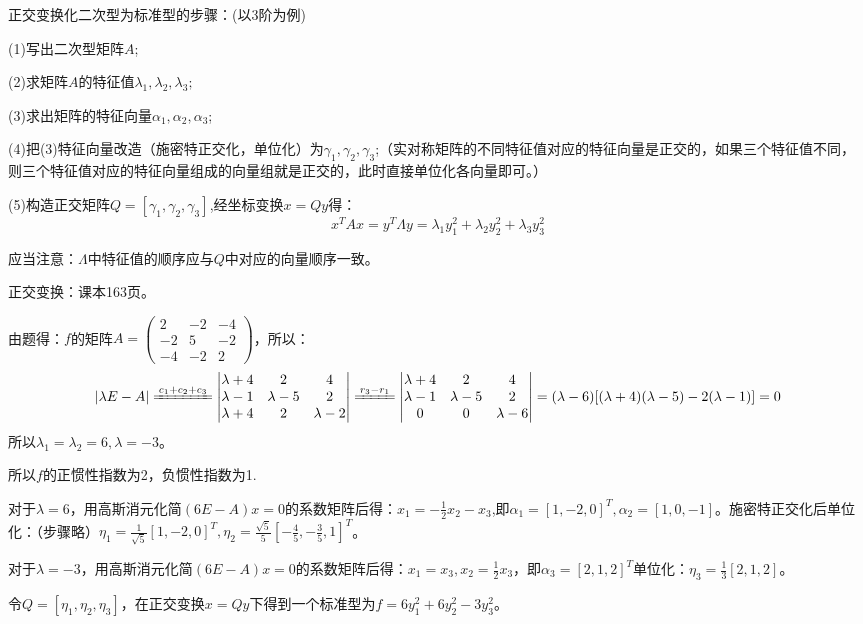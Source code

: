 \documentclass[a4paper]{report}
\begin{document}
\begin{tips}
正交变换化二次型为标准型的步骤：(以3阶为例)

(1)写出二次型矩阵$A$;

(2)求矩阵$A$的特征值$\lambda_1,\lambda_2,\lambda_3;$

(3)求出矩阵的特征向量$\alpha_1,\alpha_2,\alpha_3$;

(4)把(3)特征向量改造（施密特正交化，单位化）为$\gamma_1,\gamma_2,\gamma_3$;（实对称矩阵的不同特征值对应的特征向量是正交的，如果三个特征值不同，则三个特征值对应的特征向量组成的向量组就是正交的，此时直接单位化各向量即可。）

(5)构造正交矩阵$Q=[\gamma_1,\gamma_2,\gamma_3]$,经坐标变换$x=Qy$得：
\begin{equation*}
  x^TAx=y^T\Lambda y=\lambda_1y_1^2+\lambda_2y_2^2+\lambda_3y_3^2
\end{equation*}

应当注意：$\Lambda$中特征值的顺序应与$Q$中对应的向量顺序一致。
\end{tips}

\begin{jie}
\textcolor[rgb]{1.00,0.00,0.00}{正交变换：课本163页。}

由题得：$f$的矩阵$
A=\begin{pmatrix}
    2&-2&-4\\
    -2&5&-2\\
    -4&-2&2
  \end{pmatrix}
$，所以：
\begin{equation*}
|\lambda E-A|\xlongequal{c_1+c_2+c_3}
\begin{vmatrix}
\lambda+4&2&4\\
\lambda-1&\lambda-5&2\\
\lambda+4&2&\lambda-2
\end{vmatrix}\xlongequal{r_3-r_1}
\begin{vmatrix}
\lambda+4&2&4\\
\lambda-1&\lambda-5&2\\
0&0&\lambda-6
\end{vmatrix}=(\lambda-6)[(\lambda+4)(\lambda-5)-2(\lambda-1)]=0
\end{equation*}
所以$\lambda_1=\lambda_2=6,\lambda=-3$。

所以$f$的正惯性指数为2，负惯性指数为1.


对于$\lambda=6$，用高斯消元化简$(6E-A)x=0$的系数矩阵后得：$x_1=-\frac{1}{2}x_2-x_3$,即$\alpha_1=[1,-2,0]^T,\alpha_2=[1,0,-1]$。施密特正交化后单位化：（步骤略）$\eta_1=\frac{1}{\sqrt{5}}[1,-2,0]^T,\eta_2=\frac{\sqrt{5}}{5}[-\frac{4}{5},-\frac{3}{5},1]^T$。

对于$\lambda=-3$，用高斯消元化简$(6E-A)x=0$的系数矩阵后得：$
x_1=x_3,x_2=\frac{1}{2}x_3
$，即$\alpha_3=[2,1,2]^T$单位化：$\eta_{3}=\frac{1}{3}[2,1,2]$。

令$Q=[\eta_1,\eta_2,\eta_3]$，在正交变换$x=Qy$下得到一个标准型为$f=6y_1^{2}+6y_2^{2}-3y_3^{2}$。
\end{jie}
\end{document}

